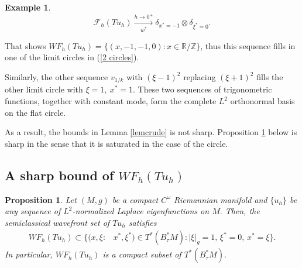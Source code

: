\documentclass[11pt,reqno]{amsart}
\newcommand{\R}{{\mathbb R}}
\newcommand{\Z}{{\mathbb Z}}
\newtheorem{proposition}[theorem]{Proposition}
\theoremstyle{definition}
\newtheorem*{Example}{Example}
\begin{document}
\begin{Example}
$$
\mathcal{F}_h(Tu_h)\xrightarrow[w^*]{h\to 0^+}\delta_{x^*=-1}\otimes\delta_{\xi^*=0}.
$$

That shows $WF_h(Tu_h)=\{(x,-1,-1,0):x\in\R/\Z\}$, thus this sequence fills in one of the limit circles in (\ref{2 circles}).

Similarly, the other sequence $v_{1/k}$ with $(\xi-1)^2$ replacing $(\xi+1)^2$ fills the other limit circle with $\xi=1,~x^*=1$. These two sequences of trigonometric functions, together with constant mode, form the complete $L^2$ orthonormal basis on the flat circle.
\end{Example}

As a result, the bounds in Lemma \ref{lemcrude} is not sharp. Proposition \ref{WF1} below is sharp in the sense that it is saturated in the case of the circle.




\subsection{A sharp bound of $WF_h(Tu_h)$}\label{seclower}

\begin{proposition}\label{WF1}
Let $(M,g)$ be a compact $C^{\omega}$ Riemannian manifold and $\{ u_h \}$ be {\em any} sequence of $L^2$-normalized Laplace eigenfunctions on $M.$ Then, the semiclassical wavefront set of $Tu_h$ satisfies
    \begin{equation}\label{wf1}
        \begin{split}
            WF_h(Tu_h)\subset\big\{(x,\xi :&x^*,\xi^*)\in T^*(B_{\tau}^*M): |\xi|_g=1, \, \xi^* = 0, \, x^* = \xi \big\}.
            \end{split}
    \end{equation}
 In particular, $WF_h(Tu_h)$ is a  compact subset of $T^* (B_{\tau}^*M).$
\end{proposition}
\end{document}
